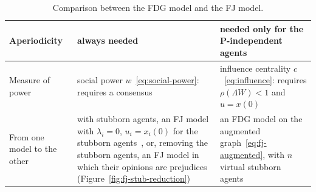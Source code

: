 \begin{table}[H]
\begin{tabular}{@{}>{\raggedright\arraybackslash}p{2.9cm}
                  >{\raggedright\arraybackslash}p{6.5cm}
                  >{\raggedright\arraybackslash}p{6.75cm}@{}}
    \midrule
    Aperiodicity
      & always needed
      & needed only for the P-independent agents \\
    \midrule
    Measure of power
      & social power $w$~\eqref{eq:social-power}: requires a consensus
      & influence centrality $c$~\eqref{eq:influence}: requires $\rho(\Lambda W) < 1$
        and $u = x(0)$ \\
    \midrule
    From one model to the other
      & with stubborn agents, an FJ model with $\lambda_i = 0$, $u_i = x_i(0)$ for the
        stubborn agents~\cite{proskurnikov2017tutorial}, or, removing the stubborn agents,
        an FJ model in which their opinions are prejudices (Figure~\ref{fig:fj-stub-reduction})
      & an FDG model on the augmented graph~\eqref{eq:fj-augmented}, with $n$ virtual
        stubborn agents \\
    \bottomrule
  \end{tabular}
  \caption{Comparison between the FDG model and the FJ model.}
  \label{tab:fdg-fj}
\end{table}

